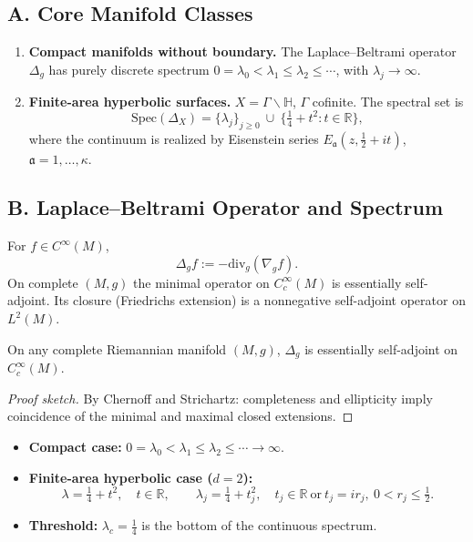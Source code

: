 \subsection*{A. Core Manifold Classes}
\label{subsec:core-classes}

\begin{definition}
\label{def:core-classes}
\begin{enumerate}[label=(\roman*)]
  \item \textbf{Compact manifolds without boundary.} The Laplace--Beltrami operator $\Delta_g$ has purely discrete spectrum $0=\lambda_0<\lambda_1\le\lambda_2\le\cdots$, with $\lambda_j\to\infty$.
  \item \textbf{Finite-area hyperbolic surfaces.} $X=\Gamma\backslash\mathbb H$, $\Gamma$ cofinite. The spectral set is
  \[
    \mathrm{Spec}(\Delta_X)=\{\lambda_j\}_{j\ge 0}\ \cup\ \{\tfrac14+t^2: t\in\mathbb R\},
  \]
  where the continuum is realized by Eisenstein series $E_{\mathfrak a}(z,\tfrac12+it)$, $\mathfrak a=1,\dots,\kappa$.
\end{enumerate}
\end{definition}

\subsection*{B. Laplace–Beltrami Operator and Spectrum}
\label{subsec:laplacian-spectrum}

\begin{definition}
\label{def:laplacian}
For $f\in C^\infty(M)$,
\[
  \Delta_g f := -\mathrm{div}_g(\nabla_g f).
\]
On complete $(M,g)$ the minimal operator on $C_c^\infty(M)$ is essentially self-adjoint. Its closure (Friedrichs extension) is a nonnegative self-adjoint operator on $L^2(M)$.
\end{definition}

\begin{lemma}
\label{lem:esa}
On any complete Riemannian manifold $(M,g)$, $\Delta_g$ is essentially self-adjoint on $C_c^\infty(M)$.
\end{lemma}

\begin{proof}[Proof sketch]
By Chernoff and Strichartz: completeness and ellipticity imply coincidence of the minimal and maximal closed extensions.
\end{proof}

\begin{conditions}
\label{cond:spec-param}
\begin{itemize}
  \item \textbf{Compact case:} $0=\lambda_0 < \lambda_1\le \lambda_2\le\cdots\to\infty$.
  \item \textbf{Finite-area hyperbolic case ($d=2$):}
  \[
    \lambda=\tfrac14+t^2,\quad t\in\mathbb R,\qquad
    \lambda_j=\tfrac14+t_j^2,\quad t_j\in\mathbb R\ \text{or}\ t_j=ir_j,\ 0<r_j\le\tfrac12.
  \]
  \item \textbf{Threshold:} $\lambda_c=\tfrac14$ is the bottom of the continuous spectrum.
\end{itemize}
\end{conditions}

